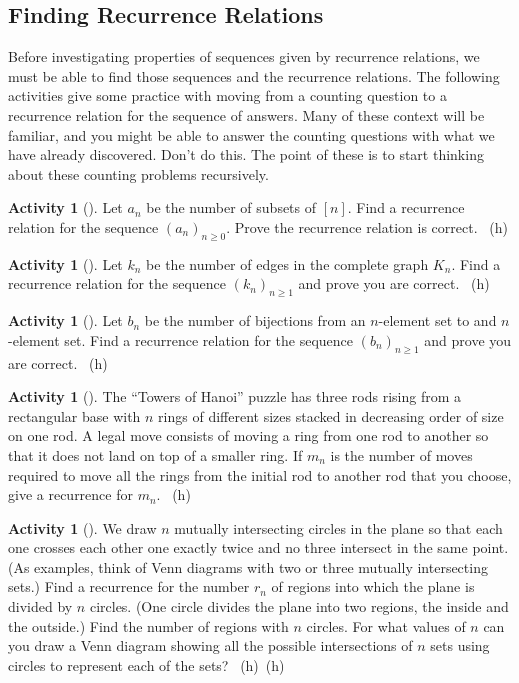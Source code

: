\documentclass[10pt,]{book}
\theoremstyle{plain}
\theoremstyle{definition}
\theoremstyle{definition}
\theoremstyle{definition}
\newtheorem{activity}[project]{Activity}
\numberwithin{equation}{chapter}
\begin{document}
\subsection[{Finding Recurrence Relations}]{Finding Recurrence Relations}\label{subsec-recursionfinding}
\hypertarget{p-891}{}%
Before investigating properties of sequences given by recurrence relations, we must be able to find those sequences and the recurrence relations.  The following activities give some practice with moving from a counting question to a recurrence relation for the sequence of answers.  Many of these context will be familiar, and you might be able to answer the counting questions with what we have already discovered.  Don't do this.  The point of these is to start thinking about these counting problems recursively.%
\begin{activity}[]\label{activity-127}
\hypertarget{p-892}{}%
Let \(a_n\) be the number of subsets of \([n]\).  Find a recurrence relation for the sequence \((a_n)_{n \ge 0}\).  Prove the recurrence relation is correct.%
~{\tiny (h)}\end{activity}
\begin{activity}[]\label{activity-128}
\hypertarget{p-894}{}%
Let \(k_n\) be the number of edges in the complete graph \(K_n\).  Find a recurrence relation for the sequence \((k_n)_{n \ge 1}\) and prove you are correct.%
~{\tiny (h)}\end{activity}
\begin{activity}[]\label{activity-129}
\hypertarget{p-896}{}%
Let \(b_n\) be the number of bijections from an \(n\)-element set to and \(n\)-element set.  Find a recurrence relation for the sequence \((b_n)_{n \ge 1}\) and prove you are correct.%
~{\tiny (h)}\end{activity}
\begin{activity}[]\label{HanoiProblem}
\hypertarget{p-898}{}%
The ``Towers of Hanoi'' puzzle has three rods rising from a rectangular base with \(n\) rings of different sizes stacked in decreasing order of size on one rod. A legal move consists of moving a ring from one rod to another so that it does not land on top of a smaller ring. If \(m_n\) is the number of moves required to move all the rings from the initial rod to another rod that you choose, give a recurrence for \(m_n\).%
~{\tiny (h)}\end{activity}
\begin{activity}[]\label{circlesinplane}
\hypertarget{p-901}{}%
We draw \(n\) mutually intersecting circles in the plane so that each one crosses each other one exactly twice and no three intersect in the same point. (As examples, think of Venn diagrams with two or three mutually intersecting sets.) Find a recurrence for the number \(r_n\) of regions into which the plane is divided by \(n\) circles. (One circle divides the plane into two regions, the inside and the outside.) Find the number of regions with \(n\) circles. For what values of \(n\) can you draw a Venn diagram showing all the possible intersections of \(n\) sets using circles to represent each of the sets?%
~{\tiny (h)}~{\tiny (h)}\end{activity}
\end{document}
